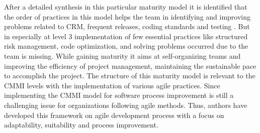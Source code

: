 \documentclass[a4paper,oneside]{bth}
\begin{document}
After a detailed synthesis in this particular maturity model it is identified that the order of practices in this model helps the team in identifying and improving problems related to CRM, frequent releases, coding standards and testing \cite{patel_agile_2009}. But in especially at level 3 implementation of few essential practices like structured risk management, code optimization, and solving problems occurred due to the team is missing. While gaining maturity it aims at self-organizing teams and improving the efficiency of project management, maintaining the sustainable pace to accomplish the project. The structure of this maturity model is relevant to the CMMI levels with the implementation of various agile practices. Since implementing the CMMI model for software process improvement is still a challenging issue for organizations following agile methods. Thus, authors have developed this framework on agile development process with a focus on adaptability, suitability and process improvement. 
\end{document}
